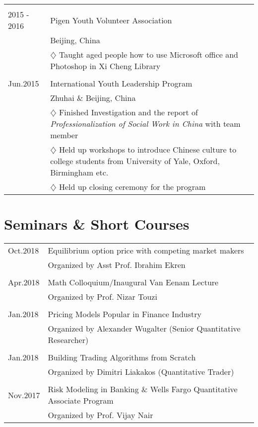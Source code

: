 \documentclass[a4paper,11pt]{article} %
\begin{document}
\begin{longtable}{p{4cm}|p{11cm}}

\multicolumn{2}{c}{}\\
2015 - 2016 & Pigen Youth Volunteer Association\\
& Beijing, China\\
& \footnotesize{$\diamondsuit$ Taught aged people how to use Microsoft office and Photoshop in Xi Cheng Library}\\

\multicolumn{2}{c}{}\\
Jun.2015 & International Youth Leadership Program\\
& Zhuhai \& Beijing, China\\
& \footnotesize{$\diamondsuit$ Finished Investigation and the report of \emph{Professionalization of Social Work in China} with team member}\\
& \footnotesize{$\diamondsuit$ Held up workshops to introduce Chinese culture to college students from University of Yale, Oxford, Birmingham etc.}\\
&\footnotesize{$\diamondsuit$ Held up closing ceremony for the program}\\
\end{longtable}

\section{Seminars \& Short Courses}

\begin{tabular}{p{2cm}|p{13cm}}

Oct.2018 & Equilibrium option price with competing market makers\\
& Organized by Asst Prof. Ibrahim Ekren\\

\multicolumn{2}{c}{}\\
Apr.2018 & Math Colloquium/Inaugural Van Eenam Lecture\\
& Organized by Prof. Nizar Touzi\\

\multicolumn{2}{c}{}\\
Jan.2018 & Pricing Models Popular in Finance Industry\\
& Organized by Alexander Wugalter (Senior Quantitative Researcher)\\

\multicolumn{2}{c}{}\\
Jan.2018 & Building Trading Algorithms from Scratch\\
& Organized by Dimitri Liakakos (Quantitative Trader)\\

\multicolumn{2}{c}{}\\
Nov.2017 & Risk Modeling in Banking \& Wells Fargo Quantitative Associate Program\\
& Organized by Prof. Vijay Nair\\

\end{tabular}
\end{document}
